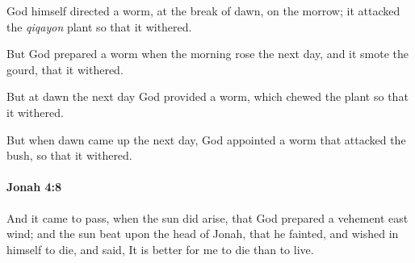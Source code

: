 			\begin{versebox}
					\item[BHS] 
					\item[LXX] 
					\item[AB 1990 300] God himself directed a worm, at the break of dawn, on the morrow; it attacked the \textit{qiqayon} plant so that it withered.
					\item[ASV] But God prepared a worm when the morning rose the next day, and it smote the gourd, that it withered.
					\item[NIV] But at dawn the next day God provided a worm, which chewed the plant so that it withered.
					\item[NRSV] But when dawn came up the next day, God appointed a worm that attacked the bush, so that it withered.
			\end{versebox}

		\paragraph{Jonah 4:8} %
			\label{JONAH-4-8}

			And it came to pass, when the sun did arise, that God prepared a vehement east wind; and the sun beat upon the head of Jonah, that he fainted, and wished in himself to die, and said, It is better for me to die than to live.

